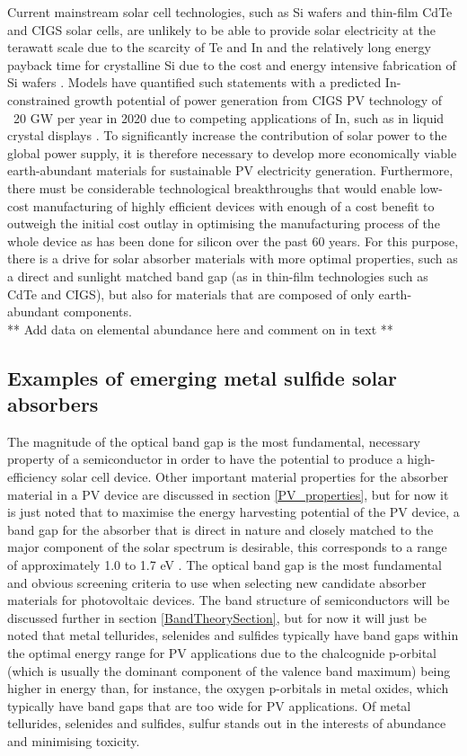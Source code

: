 \documentclass[11pt, twoside]{report}
\begin{document}
Current mainstream solar cell technologies, such as Si wafers and thin-film CdTe and CIGS solar cells, are unlikely to be able to provide solar electricity at the terawatt scale due to the scarcity of Te and In and the relatively long energy payback time for crystalline Si due to the cost and energy intensive fabrication of Si wafers \cite{CZTS_vs_MAPI}. 
Models have quantified such statements with a predicted In-constrained growth potential of power generation from CIGS PV technology of ~20 GW per year in 2020 due to competing applications of In, such as in liquid crystal displays \cite{culprit_5_3}.
To significantly increase the contribution of solar power to the global power supply, it is therefore necessary to develop more economically viable earth-abundant materials for sustainable PV electricity generation. Furthermore, there must be considerable technological breakthroughs that would enable low-cost manufacturing of highly efficient devices with enough of a cost benefit to outweigh the initial cost outlay in optimising the manufacturing process of the whole device as has been done for silicon over the past 60 years. For this purpose, there is a drive for solar absorber materials with more optimal properties, such as a direct and sunlight matched band gap (as in thin-film technologies such as CdTe and CIGS), but also for materials that are composed of only earth-abundant components.\\

** Add data on elemental abundance here and comment on in text **

\subsection{Examples of emerging metal sulfide solar absorbers}

The magnitude of the optical band gap is the most fundamental, necessary property of a semiconductor in order to have the potential to produce a high-efficiency solar cell device. Other important material properties for the absorber material in a PV device are discussed in section \ref{PV_properties}, but for now it is just noted that to maximise the energy harvesting potential of the PV device, a band gap for the absorber that is direct in nature and closely matched to the major component of the solar spectrum is desirable, this corresponds to a range of approximately 1.0 to 1.7 eV \cite{PV_E_range}. The optical band gap is the most fundamental and obvious screening criteria to use when selecting new candidate absorber materials for photovoltaic devices. The band structure of semiconductors will be discussed further in section \ref{BandTheorySection}, but for now it will just be noted that metal tellurides, selenides and sulfides typically have band gaps within the optimal energy range for PV applications due to the chalcognide p-orbital (which is usually the dominant component of the valence band maximum) being higher in energy than, for instance, the oxygen p-orbitals in metal oxides, which typically have band gaps that are too wide for PV applications. Of metal tellurides, selenides and sulfides, sulfur stands out in the interests of abundance and minimising toxicity.
\end{document}
